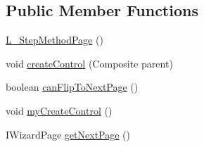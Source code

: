 \subsection*{Public Member Functions}
\begin{DoxyCompactItemize}
\item 
\hyperlink{classit_1_1isislab_1_1masonhelperdocumentation_1_1mason_1_1wizards_1_1_l___step_method_page_ae63b8fc92a263e94bef137135e5f47da}{L\-\_\-\-Step\-Method\-Page} ()
\item 
void \hyperlink{classit_1_1isislab_1_1masonhelperdocumentation_1_1mason_1_1wizards_1_1_l___step_method_page_a7ac059639f3d02f171b665fbbeca7961}{create\-Control} (Composite parent)
\item 
boolean \hyperlink{classit_1_1isislab_1_1masonhelperdocumentation_1_1mason_1_1wizards_1_1_l___step_method_page_a059c070afcbcb3d2004c61c87f19fb07}{can\-Flip\-To\-Next\-Page} ()
\item 
void \hyperlink{classit_1_1isislab_1_1masonhelperdocumentation_1_1mason_1_1wizards_1_1_l___step_method_page_aae5b5f889fca35447959d7f5f4f264a7}{my\-Create\-Control} ()
\item 
I\-Wizard\-Page \hyperlink{classit_1_1isislab_1_1masonhelperdocumentation_1_1mason_1_1wizards_1_1_l___step_method_page_a3aa5cb9ab01aceaa78dd1294d9e5f330}{get\-Next\-Page} ()
\end{DoxyCompactItemize}
